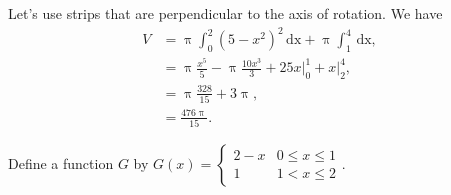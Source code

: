 \documentclass[12pt,fleqn]{exam}
\newcommand{\dom}{\mbox{dom}}
\begin{document}
\begin{questions}
\begin{parts}
    \begin{solution}[2.5in] Let's use strips that are perpendicular to 
        the axis of rotation. We have
        \begin{align*}
          V &= \uppi \int_0^2 (5-x^2)^2 \, \mathrm{dx} + \uppi \int_1^4 \, \mathrm{dx}, \\
            &= \uppi \frac{{{x}^{5}}}{5}- \uppi \frac{10 {{x}^{3}}}{3}+25 x \vert_0^1 +
              x \vert_2^4, \\
            &= \uppi \frac{328}{15} + 3 \uppi, \\
            &= \frac{476 \uppi}{15}.
        \end{align*}
            
       
    \end{solution}

\end{parts}

\newpage
\question Define a function $G$ by 
$G(x) = \begin{cases} 2-x & 0 \leq x \leq 1 \\
                       1  & 1 < x \leq 2
\end{cases}.
$

\end{questions}
\end{document}
